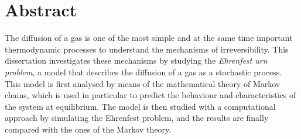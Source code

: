 \chapter*{Abstract}
The diffusion of a gas is one of the most simple and at the same time important thermodynamic processes to understand the mechanisms of irreversibility. This dissertation investigates these mechanisms by studying the \emph{Ehrenfest urn problem}, a model that describes the diffusion of a gas as a stochastic process. This model is first analysed by means of the mathematical theory of Markov chains, which is used in particular to predict the behaviour and characteristics of the system at equilibrium. The model is then studied with a computational approach by simulating the Ehrenfest problem, and the results are finally compared with the ones of the Markov theory.